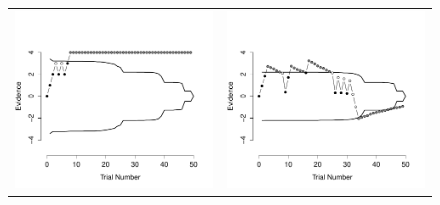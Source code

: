 \documentclass[authoryear]{elsarticle}
\begin{document}
\begin{figure}[t]
\begin{center}
\begin{tabular}{cc}
\hspace*{-.5cm} \includegraphics[scale=0.5]{./behaviourStatic.pdf} \hspace*{-.5cm}&
\includegraphics[scale=0.5]{./behaviourDynamic.pdf} \\

\end{tabular}
\end{center}
\end{figure}
\end{document}
